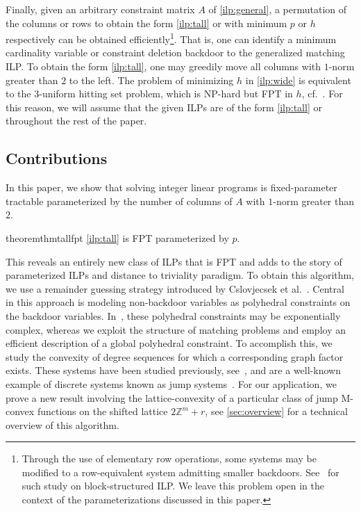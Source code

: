 \documentclass[a4paper,UKenglish,cleveref,thm-restate]{lipics-v2021}
\newcommand{\Z}{\mathbb Z}
\begin{document}
Finally, given an arbitrary constraint matrix $A$ of \cref{ilp:general}, a permutation of the columns or rows to obtain the form \cref{ilp:tall} or  with minimum $p$ or $h$ respectively can be obtained efficiently\footnote{Through the use of elementary row operations, some systems may be modified to a row-equivalent system admitting smaller backdoors. See~\cite{DBLP:journals/mp/BrianskiKKPS24} for such study on block-structured ILP. We leave this problem open in the context of the parameterizations discussed in this paper.}. That is, one can identify a minimum cardinality variable or constraint deletion backdoor to the generalized matching ILP. To obtain the form \cref{ilp:tall}, one may greedily move all columns with $1$-norm greater than $2$ to the left. The problem of minimizing $h$ in \cref{ilp:wide} is equivalent to the $3$-uniform hitting set problem, which is NP-hard but FPT in $h$, cf.~\cite{DBLP:conf/birthday/GaspersS12}. For this reason, we will assume that the given ILPs are of the form \cref{ilp:tall} or  throughout the rest of the paper.

\subsection{Contributions}

In this paper, we show that solving integer linear programs is fixed-parameter tractable parameterized by the number of columns of $A$ with $1$-norm greater than $2$.

\begin{restatable}{theorem}{thmtallfpt}
    \cref{ilp:tall} is FPT parameterized by $p$.
    \label{thm:tall-fpt}
\end{restatable}

This reveals an entirely new class of ILPs that is FPT and adds to the story of parameterized ILPs and distance to triviality paradigm. To obtain this algorithm, we use a remainder guessing strategy introduced by Cslovjecsek et al.~\cite{DBLP:conf/soda/CslovjecsekKLPP24}. Central in this approach is modeling non-backdoor variables as polyhedral constraints on the backdoor variables. In~\cite{DBLP:conf/soda/CslovjecsekKLPP24}, these polyhedral constraints may be exponentially complex, whereas we exploit the structure of matching problems and employ an efficient description of a global polyhedral constraint. To accomplish this, we study the convexity of degree sequences for which a corresponding graph factor exists. These systems have been studied previously, see~\cite{DBLP:journals/jgt/AnsteeN99}, and are a well-known example of discrete systems known as jump systems~\cite{DBLP:journals/siamdm/BouchetC95,DBLP:journals/siamdm/Murota06,DBLP:journals/ieicet/MurotaT06,DBLP:conf/ipco/Kobayashi23}. For our application, we prove a new result involving the lattice-convexity of a particular class of jump M-convex functions on the shifted lattice $2\Z^m+r$, see \cref{sec:overview} for a technical overview of this algorithm. 
\end{document}
